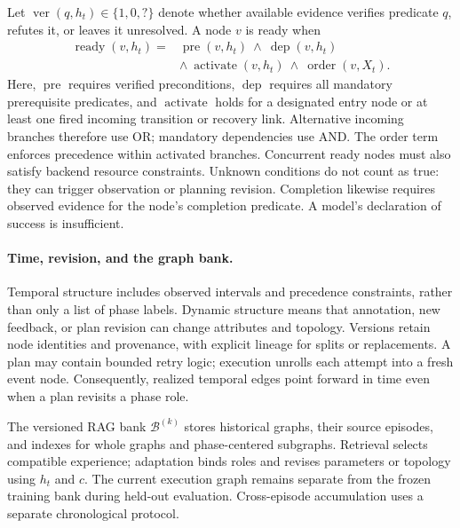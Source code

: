 \documentclass[10pt,twocolumn,letterpaper]{article}
\begin{document}
Let $\operatorname{ver}(q,h_t)\in\{1,0,?\}$ denote whether available evidence verifies predicate $q$, refutes it, or leaves it unresolved. A node $v$ is ready when
\begin{equation}
\begin{split}
\operatorname{ready}(v,h_t)={}&
\operatorname{pre}(v,h_t)\ \land\ \operatorname{dep}(v,h_t)\\
&\land\ \operatorname{activate}(v,h_t)\ \land\ \operatorname{order}(v,X_t).
\end{split}
\label{eq:readiness}
\end{equation}
Here, $\operatorname{pre}$ requires verified preconditions, $\operatorname{dep}$ requires all mandatory prerequisite predicates, and $\operatorname{activate}$ holds for a designated entry node or at least one fired incoming transition or recovery link. Alternative incoming branches therefore use OR; mandatory dependencies use AND. The order term enforces precedence within activated branches. Concurrent ready nodes must also satisfy backend resource constraints. Unknown conditions do not count as true: they can trigger observation or planning revision. Completion likewise requires observed evidence for the node's completion predicate. A model's declaration of success is insufficient.

\paragraph{Time, revision, and the graph bank.}
Temporal structure includes observed intervals and precedence constraints, rather than only a list of phase labels. Dynamic structure means that annotation, new feedback, or plan revision can change attributes and topology. Versions retain node identities and provenance, with explicit lineage for splits or replacements. A plan may contain bounded retry logic; execution unrolls each attempt into a fresh event node. Consequently, realized temporal edges point forward in time even when a plan revisits a phase role.

The versioned RAG bank $\mathcal B^{(k)}$ stores historical graphs, their source episodes, and indexes for whole graphs and phase-centered subgraphs. Retrieval selects compatible experience; adaptation binds roles and revises parameters or topology using $h_t$ and $c$. The current execution graph remains separate from the frozen training bank during held-out evaluation. Cross-episode accumulation uses a separate chronological protocol.
\end{document}
